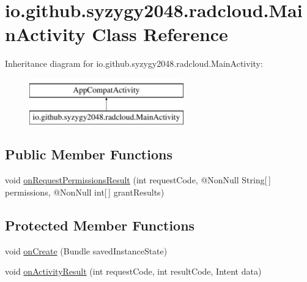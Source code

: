 \hypertarget{classio_1_1github_1_1syzygy2048_1_1radcloud_1_1_main_activity}{}\section{io.\+github.\+syzygy2048.\+radcloud.\+Main\+Activity Class Reference}
\label{classio_1_1github_1_1syzygy2048_1_1radcloud_1_1_main_activity}
Inheritance diagram for io.\+github.\+syzygy2048.\+radcloud.\+Main\+Activity\+:\begin{figure}[H]
\begin{center}
\leavevmode
\includegraphics[height=2.000000cm]{classio_1_1github_1_1syzygy2048_1_1radcloud_1_1_main_activity}
\end{center}
\end{figure}
\subsection*{Public Member Functions}
\begin{DoxyCompactItemize}
\item 
void \mbox{\hyperlink{classio_1_1github_1_1syzygy2048_1_1radcloud_1_1_main_activity_aadc64331c63553c85bfc45ce9cee66b2}{on\+Request\+Permissions\+Result}} (int request\+Code, @Non\+Null String\mbox{[}$\,$\mbox{]} permissions, @Non\+Null int\mbox{[}$\,$\mbox{]} grant\+Results)
\end{DoxyCompactItemize}
\subsection*{Protected Member Functions}
\begin{DoxyCompactItemize}
\item 
void \mbox{\hyperlink{classio_1_1github_1_1syzygy2048_1_1radcloud_1_1_main_activity_a3f1dec2ae5371ebbd577d105c8834d74}{on\+Create}} (Bundle saved\+Instance\+State)
\item 
void \mbox{\hyperlink{classio_1_1github_1_1syzygy2048_1_1radcloud_1_1_main_activity_ad31d9aa9ec5da472c81e8b9d4e653bba}{on\+Activity\+Result}} (int request\+Code, int result\+Code, Intent data)
\end{DoxyCompactItemize}


